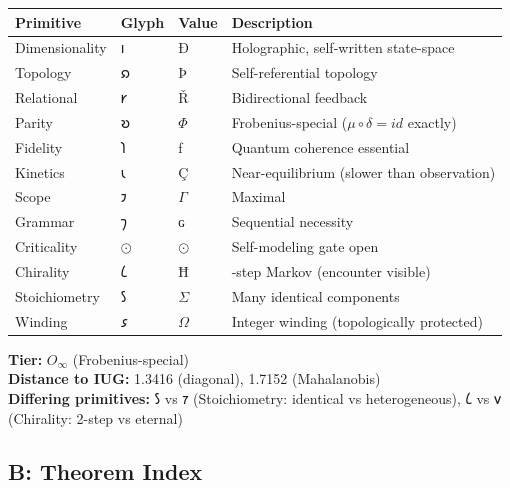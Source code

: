 \documentclass[10pt,a4paper]{article}
\begin{document}
\begin{table}[htbp]
\centering
\small
{}
\begin{tabularx}{\textwidth}{>{\centering\arraybackslash}X >{\centering\arraybackslash}X >{\centering\arraybackslash}X >{\centering\arraybackslash}X}
\toprule
\rowcolor{gray!25}\textbf{Primitive} & \textbf{Glyph} & \textbf{Value} & \textbf{Description} \\
\midrule
\rowcolors{1}{white}{gray!10}
Dimensionality & 𐑦 & Ð & Holographic, self-written state-space \\
Topology & 𐑸 & Þ & Self-referential topology \\
Relational & 𐑾 & Ř & Bidirectional feedback \\
Parity & 𐑹 & $\Phi$ & Frobenius-special ($\mu\circ\delta = id$ exactly) \\
Fidelity & 𐑐 & ƒ & Quantum coherence essential \\
Kinetics & 𐑧 & Ç & Near-equilibrium (slower than observation) \\
Scope & 𐑲 & $\Gamma$ & Maximal \\
Grammar & 𐑠 & ɢ & Sequential necessity \\
Criticality & $\odot$ & $\odot$ & Self-modeling gate open \\
Chirality & 𐑖 & Ħ & 2-step Markov (encounter visible) \\
Stoichiometry & 𐑕 & $\Sigma$ & Many identical components \\
Winding & 𐑭 & $\Omega$ & Integer winding (topologically protected) \\
\bottomrule
\end{tabularx}
\end{table}

\textbf{Tier:} $O_{\infty}$ (Frobenius-special) \\
\textbf{Distance to IUG:} 1.3416 (diagonal), 1.7152 (Mahalanobis) \\
\textbf{Differing primitives:} 𐑕 vs 𐑳 (Stoichiometry: identical vs heterogeneous), 𐑖 vs 𐑫 (Chirality: 2-step vs eternal)

\subsection{B: Theorem Index}
\end{document}
